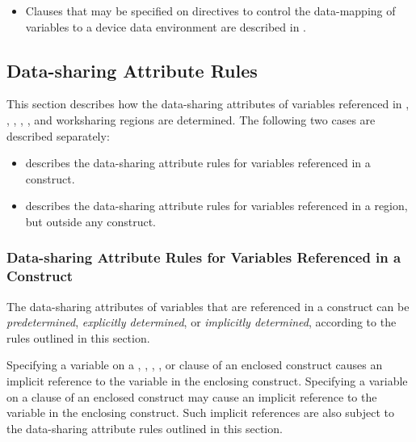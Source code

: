 {{{{\begin{itemize}
\item Clauses that may be specified on directives to control the data-mapping of variables to a device data environment are described in .
\end{itemize}










\subsection{Data-sharing Attribute Rules}
\label{subsec:Data-sharing Attribute Rules}
This section describes how the data-sharing attributes of variables referenced in 
, , , , , and worksharing regions are determined. The following two cases are described separately:

\begin{itemize}
\item {} 
describes the data-sharing attribute rules for variables 
referenced in a construct.

\item {} describes the data-sharing attribute rules for variables 
referenced in a region, but outside any construct. 
\end{itemize}









\subsubsection{Data-sharing Attribute Rules for Variables Referenced in a Construct}
\label{subsubsec:Data-sharing Attribute Rules for Variables Referenced in a Construct}
The data-sharing attributes of variables that are referenced in a construct can be 
\emph{predetermined}, \emph{explicitly determined}, or \emph{implicitly determined}, according to the rules 
outlined in this section.

Specifying a variable on a , , , , 
or  clause of an enclosed construct causes an implicit reference to the 
variable in the enclosing construct. Specifying a variable on a  clause of an enclosed 
construct may cause an implicit reference to the variable in the enclosing construct. 
Such implicit references are also subject to the data-sharing attribute rules outlined in 
this section.

}}}}
